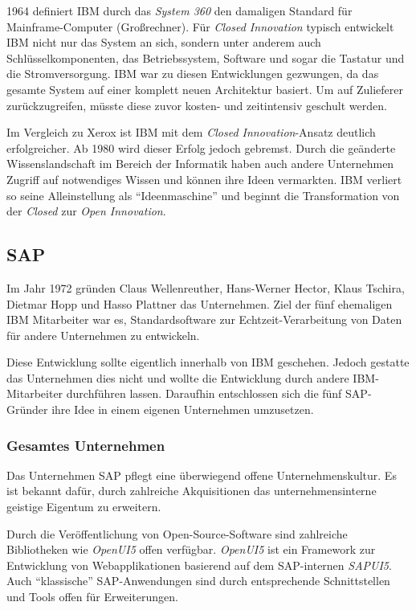 1964 definiert IBM durch das \textit{System 360} den damaligen Standard für Mainframe-Computer (Großrechner).
Für \textit{Closed Innovation} typisch entwickelt IBM nicht nur das System an sich,
sondern unter anderem auch Schlüsselkomponenten, das Betriebssystem, Software und sogar die Tastatur und die Stromversorgung.
IBM war zu diesen Entwicklungen gezwungen,
da das gesamte System auf einer komplett neuen Architektur basiert.
Um auf Zulieferer zurückzugreifen, müsste diese zuvor kosten- und zeitintensiv geschult werden.

Im Vergleich zu Xerox ist IBM mit dem \textit{Closed Innovation}-Ansatz deutlich erfolgreicher.
Ab 1980 wird dieser Erfolg jedoch gebremst.
Durch die geänderte Wissenslandschaft im Bereich der Informatik haben auch andere Unternehmen
Zugriff auf notwendiges Wissen und können ihre Ideen vermarkten.
IBM verliert so seine Alleinstellung als \enquote{Ideenmaschine}
und beginnt die Transformation von der \textit{Closed} zur \textit{Open Innovation}.


\subsection{SAP}\label{sec:beispiele-sap}
Im Jahr 1972 gründen Claus Wellenreuther, Hans-Werner Hector, Klaus Tschira, Dietmar Hopp und Hasso Plattner das Unternehmen.
Ziel der fünf ehemaligen IBM Mitarbeiter war es,
Standardsoftware zur Echtzeit-\linebreak{}Verarbeitung von Daten für andere Unternehmen zu entwickeln.

Diese Entwicklung sollte eigentlich innerhalb von IBM geschehen.
Jedoch gestatte das Unternehmen dies nicht und wollte die Entwicklung durch andere IBM-Mitarbeiter durchführen lassen.
Daraufhin entschlossen sich die fünf SAP-Gründer ihre Idee in einem eigenen Unternehmen umzusetzen. \cite{SAPCompa72:online}

\subsubsection{Gesamtes Unternehmen}\label{sec:beispiele-sap-gesamt}
Das Unternehmen SAP pflegt eine überwiegend offene Unternehmenskultur.
Es ist bekannt dafür, durch zahlreiche Akquisitionen das unternehmensinterne geistige Eigentum zu erweitern.

Durch die Veröffentlichung von Open-Source-Software sind zahlreiche Bibliotheken wie \textit{OpenUI5} offen verfügbar.
\textit{OpenUI5} ist ein Framework zur Entwicklung von Webapplikationen basierend auf dem SAP-internen \textit{SAPUI5}.
Auch \enquote{klassische} SAP-Anwendungen sind durch entsprechende Schnittstellen
und Tools offen für Erweiterungen.

